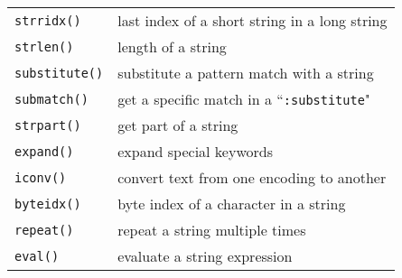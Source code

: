 \begin{center}
\begin{tabular}{l l}
				\texttt{strridx()} & last index of a short string in a long string \\
				\texttt{strlen()} & length of a string \\
				\texttt{substitute()} & substitute a pattern match with a string \\
				\texttt{submatch()} & get a specific match in a ``\texttt{:substitute}" \\
				\texttt{strpart()} & get part of a string \\
				\texttt{expand()} & expand special keywords \\
				\texttt{iconv()} & convert text from one encoding to another \\
				\texttt{byteidx()} & byte index of a character in a string \\
				\texttt{repeat()} & repeat a string multiple times \\
				\texttt{eval()} & evaluate a string expression \\
\end{tabular} \end{center}

